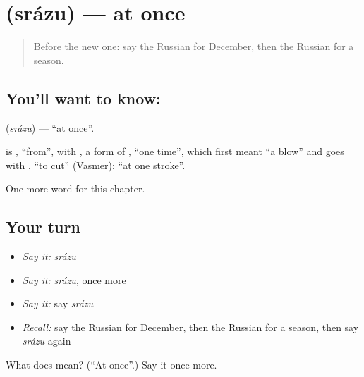 \section[\texorpdfstring{\ru{сразу} (srázu)}{сразу (srázu)}]{ (srázu) — at once}

\label{lesson:RU-C240-srazu}



\begin{quote}
Before the new one: say the Russian for December, then the Russian for a season.
\end{quote}

\subsection*{You'll want to know: }
\textbf{} (\emph{srázu}) — \textquotedblleft{}at once\textquotedblright{}.

\begin{cousinweb}
\textbf{} is \emph{}, \textquotedblleft{}from\textquotedblright{}, with \emph{}, a form of \emph{}, \textquotedblleft{}one time\textquotedblright{}, which first meant \textquotedblleft{}a blow\textquotedblright{} and goes with \emph{}, \textquotedblleft{}to cut\textquotedblright{} (Vasmer): \textquotedblleft{}at one stroke\textquotedblright{}.
\end{cousinweb}

\begin{grammarlens}[title={What you've built}]
One more word for this chapter.
\end{grammarlens}

\subsection*{Your turn}
\begin{itemize}
\raggedright
  \item \emph{Say it:} \emph{srázu}
  \item \emph{Say it:} \emph{srázu}, once more
  \item \emph{Say it:} say \emph{srázu}
  \item \emph{Recall:} say the Russian for December, then the Russian for a season, then say \emph{srázu} again
\end{itemize}

\begin{tcolorbox}[breakable,colback=teal!4,colframe=teal!35!black,title={Before you move on}]
What does  mean? (\textquotedblleft{}At once\textquotedblright{}.) Say it once more.
\end{tcolorbox}
